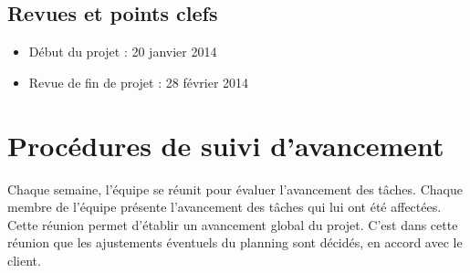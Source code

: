 \documentclass[a4paper,11pt,french]{article}
\begin{document}
\subsection{Revues et points clefs}
\begin{itemize}
\item Début du projet : 20 janvier 2014
\item Revue de fin de projet : 28 février 2014
\end{itemize}

\newpage
\section{Procédures de suivi d'avancement}

Chaque semaine, l'équipe se réunit pour évaluer l'avancement des tâches.
Chaque membre de l'équipe présente l'avancement des tâches qui lui ont été affectées.
Cette réunion permet d'établir un avancement global du projet.
C'est dans cette réunion que les ajustements éventuels du planning sont décidés, en accord avec le client.
\end{document}
